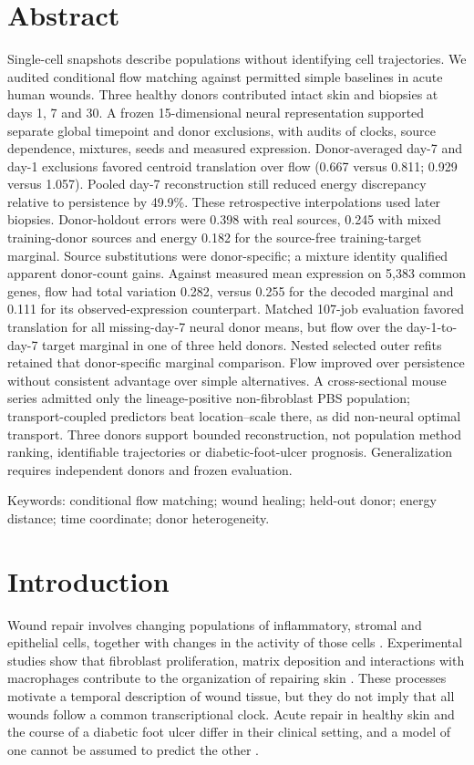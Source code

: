 \documentclass[10pt,a4paper]{article}
\begin{document}
\section*{Abstract}
\noindent Single-cell snapshots describe populations without identifying cell trajectories. We audited conditional flow matching against permitted simple baselines in acute human wounds.
Three healthy donors contributed intact skin and biopsies at days 1, 7 and 30. A frozen 15-dimensional neural representation supported separate global timepoint and donor exclusions, with audits of clocks, source dependence, mixtures, seeds and measured expression.
Donor-averaged day-7 and day-1 exclusions favored centroid translation over flow (0.667 versus 0.811; 0.929 versus 1.057). Pooled day-7 reconstruction still reduced energy discrepancy relative to persistence by 49.9\%. These retrospective interpolations used later biopsies. Donor-holdout errors were 0.398 with real sources, 0.245 with mixed training-donor sources and energy 0.182 for the source-free training-target marginal. Source substitutions were donor-specific; a mixture identity qualified apparent donor-count gains. Against measured mean expression on 5,383 common genes, flow had total variation 0.282, versus 0.255 for the decoded marginal and 0.111 for its observed-expression counterpart.
Matched 107-job evaluation favored translation for all missing-day-7 neural donor means, but flow over the day-1-to-day-7 target marginal in one of three held donors. Nested selected outer refits retained that donor-specific marginal comparison. Flow improved over persistence without consistent advantage over simple alternatives. A cross-sectional mouse series admitted only the lineage-positive non-fibroblast PBS population; transport-coupled predictors beat location--scale there, as did non-neural optimal transport. Three donors support bounded reconstruction, not population method ranking, identifiable trajectories or diabetic-foot-ulcer prognosis. Generalization requires independent donors and frozen evaluation.
\par\smallskip\noindent Keywords: conditional flow matching; wound healing; held-out donor; energy distance; time coordinate; donor heterogeneity.

\section{Introduction}
Wound repair involves changing populations of inflammatory, stromal and epithelial cells, together with changes in the activity of those cells \citep{wilkinson2020}. Experimental studies show that fibroblast proliferation, matrix deposition and interactions with macrophages contribute to the organization of repairing skin \citep{rognoni2018,shook2018}. These processes motivate a temporal description of wound tissue, but they do not imply that all wounds follow a common transcriptional clock. Acute repair in healthy skin and the course of a diabetic foot ulcer differ in their clinical setting, and a model of one cannot be assumed to predict the other \citep{armstrong2017}.
\end{document}
